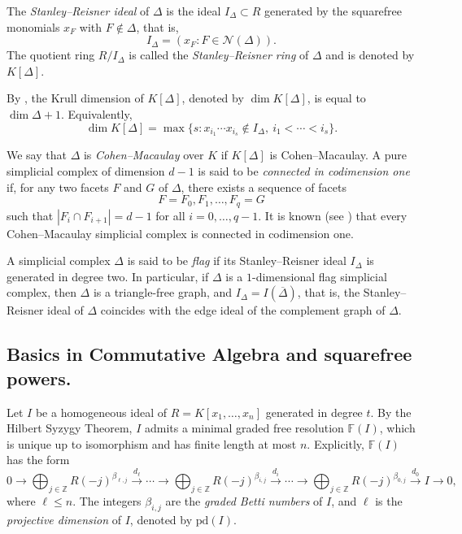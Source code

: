 \documentclass[12pt]{amsart}
\let\to=\rightarrow
\begin{document}
The \textit{Stanley--Reisner ideal} of $\Delta$ is the ideal $I_\Delta \subset R$ generated by the squarefree monomials $x_F$ with $F \notin \Delta$, that is,
\[
I_\Delta = (x_F : F \in \mathcal{N}(\Delta)).
\]
The quotient ring $R/I_\Delta$ is called the \textit{Stanley--Reisner ring} of $\Delta$ and is denoted by $K[\Delta]$.

By \cite[Corollary 6.3.5]{Villarreal}, the Krull dimension of $K[\Delta]$, denoted by $\dim K[\Delta]$, is equal to $\dim \Delta + 1$. Equivalently,
\[
\dim K[\Delta] = \max\{s : x_{i_1}\cdots x_{i_s} \notin I_\Delta,\ i_1 < \cdots < i_s\}.
\]

We say that $\Delta$ is \textit{Cohen--Macaulay} over $K$ if $K[\Delta]$ is Cohen--Macaulay. A pure simplicial complex of dimension $d-1$ is said to be \textit{connected in codimension one} if, for any two facets $F$ and $G$ of $\Delta$, there exists a sequence of facets
\[
F = F_0, F_1, \ldots, F_q = G
\]
such that $|F_i \cap F_{i+1}| = d-1$ for all $i = 0, \ldots, q-1$. It is known (see \cite[Lemma 9.1.12]{HHmonomialideals}) that every Cohen--Macaulay simplicial complex is connected in codimension one.

A simplicial complex $\Delta$ is said to be \textit{flag} if its Stanley--Reisner ideal $I_{\Delta}$ is generated in degree two. In particular, if $\Delta$ is a $1$-dimensional flag simplicial complex, then $\Delta$ is a triangle-free graph, and $I_{\Delta} = I(\overline{\Delta})$, that is, the Stanley--Reisner ideal of $\Delta$ coincides with the edge ideal of the complement graph of $\Delta$.

\subsection{Basics in Commutative Algebra and squarefree powers.}\label{SubSec2}


Let $I$ be a homogeneous ideal of $R=K[x_1, \ldots, x_n]$ generated in degree $t$. By the Hilbert Syzygy Theorem, $I$ admits a minimal graded free resolution $\mathbb{F}(I)$, which is unique up to isomorphism and has finite length at most $n$. Explicitly, $\mathbb{F}(I)$ has the form
\[
0 \to \bigoplus_{j \in \mathbb{Z}} R(-j)^{\beta_{\ell,j}}
\xrightarrow{d_\ell} \cdots
\to \bigoplus_{j \in \mathbb{Z}} R(-j)^{\beta_{i,j}}
\xrightarrow{d_i} \cdots
\to \bigoplus_{j \in \mathbb{Z}} R(-j)^{\beta_{0,j}}
\xrightarrow{d_0} I \to 0,
\]
where $\ell \le n$. The integers $\beta_{i,j}$ are the \emph{graded Betti numbers} of $I$, and $\ell$ is the \textit{projective dimension} of $I$, denoted by $\mathrm{pd}(I)$.
\end{document}
